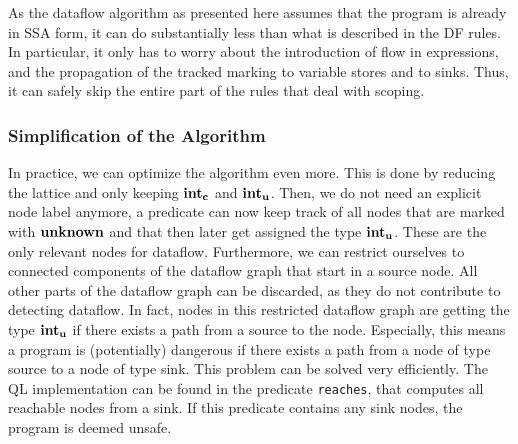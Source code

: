 As the dataflow algorithm as presented here assumes that the program is already in 
SSA form, it can do substantially less than what is described in the DF rules.
In particular, it only has to worry about the introduction of flow in expressions,
and the propagation of the tracked marking to variable stores and to sinks.
Thus, it can safely skip the entire part of the rules that deal with scoping.


\subsubsection*{Simplification of the Algorithm}
In practice, we can optimize the algorithm even more.
This is done by reducing the lattice and only keeping $\textbf{int}_\textbf{c}$ and $\textbf{int}_\textbf{u}$.
Then, we do not need an explicit node label anymore, a predicate can now
keep track of all nodes that are marked with $\textbf{unknown}$ and that then later 
get assigned the type $\textbf{int}_\textbf{u}$.
These are the only relevant nodes for dataflow.
Furthermore, we can restrict ourselves to connected components of the dataflow graph
that start in a source node.
All other parts of the dataflow graph can be discarded, as they do not contribute 
to detecting dataflow.
In fact, nodes in this restricted dataflow graph are getting the type $\textbf{int}_\textbf{u}$ if there
exists a path from a source to the node.
Especially, this means a program is (potentially) dangerous if there exists a path
from a node of type source to a node of type sink.
This problem can be solved very efficiently.
The QL implementation can be found in the predicate \texttt{reaches},
that computes all reachable nodes from a sink.
If this predicate contains any sink nodes, the program is deemed unsafe.

